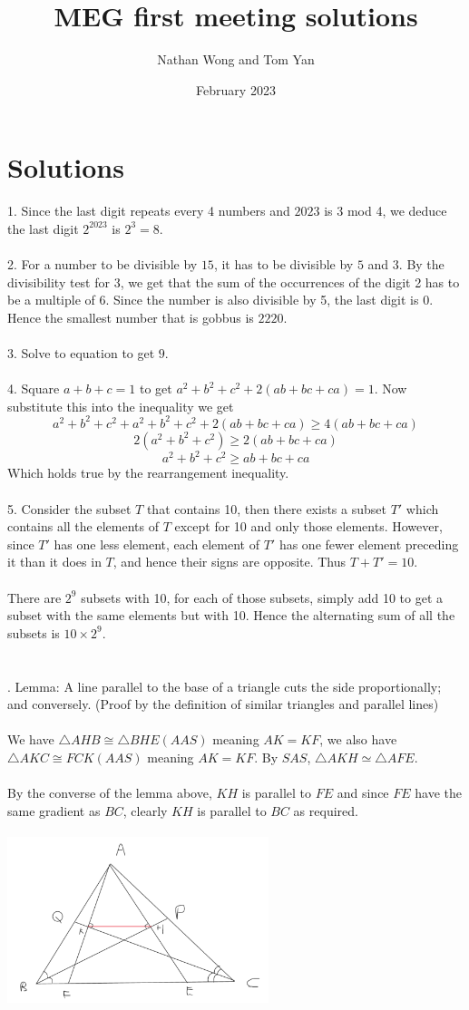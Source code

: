 \documentclass{article}
\title{MEG first meeting solutions}
\author{Nathan Wong and Tom Yan}
\date{February 2023}
\begin{document}
\maketitle

\section*{Solutions}
1. Since the last digit repeats every 4 numbers and $2023$ is 3 mod 4, we deduce the last digit $2^{2023}$ is $2^3=8$. \\\\
2. For a number to be divisible by $15$, it has to be divisible by $5$ and $3$. By the divisibility test for 3, we get that the sum of the occurrences of the digit 2 has to be a multiple of 6. Since the number is also divisible by 5, the last digit is 0. Hence the smallest number that is gobbus is $2220$.  \\\\
3. Solve to equation to get $9$. \\\\
4. Square $a+b+c=1$ to get $a^2+b^2+c^2+2(ab+bc+ca)=1.$ Now substitute this into the inequality we get $$a^2+b^2+c^2+a^2+b^2+c^2+2(ab+bc+ca) \ge 4(ab+bc+ca)$$ $$ 2(a^2+b^2+c^2) \ge 2(ab+bc+ca)$$ $$a^2+b^2+c^2 \ge ab+bc+ca$$ Which holds true by the rearrangement inequality. \\\\
5. Consider the subset $T$ that contains 10, then there exists a subset $T'$  which contains all the elements of $T$ except for 10 and only those elements. However, since $T'$ has one less element, each element of $T'$ has one fewer element preceding it than it does in $T$, and hence their signs are opposite. Thus $T + T' = 10$. \\\\ There are $2^9$ subsets with 10, for each of those subsets, simply add 10 to get a subset with the same elements but with 10. Hence the alternating sum of all the subsets is $10 \times 2^9$. \\\\\\
. Lemma: A line parallel to the base of a triangle cuts the side proportionally; and conversely. (Proof by the definition of similar triangles and parallel lines) \\\\  We have $\triangle AHB \cong \triangle BHE (AAS)$ meaning $AK = KF$, we also have $\triangle AKC \cong FCK (AAS)$ meaning $AK = KF$. By $SAS$, $\triangle AKH \simeq \triangle AFE $. \\\\ By the converse of the lemma above, $KH$ is parallel to $FE$ and since $FE$ have the same gradient as $BC$, clearly $KH$ is parallel to $BC$ as required.  \\ 
\centerline{\includegraphics[width=3in, height=2in]{Screenshot_20230217_072116.png}}\\\\
\end{document}
